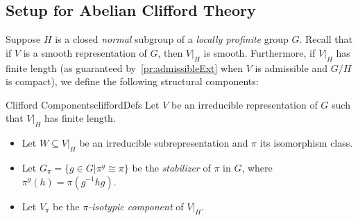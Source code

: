\documentclass{article}
\renewcommand{\mid}{\big|}
\begin{document}
\subsection*{Setup for Abelian Clifford Theory}

Suppose $H$ is a closed \emph{normal} subgroup of a \emph{locally profinite} group $G$.
Recall that if $V$ is a smooth representation of $G$, then $V|_H$ is smooth.
Furthermore, if $V|_H$ has finite length (as guaranteed by~\cref{pr:admissibleExt} when $V$ is admissible and $G/H$ is compact), we define the following structural components:

\begin{defn}{Clifford Components}{cliffordDefs}
Let $V$ be an irreducible representation of $G$ such that $V|_H$ has finite length.
\begin{itemize}
    \item Let $W \subseteq V|_H$ be an irreducible subrepresentation and $\pi$ its isomorphism class.
    \item Let $G_\pi = \{ g \in G \mid \pi^g \cong \pi \}$ be the \emph{stabilizer} of $\pi$ in $G$, where
      $\pi^g(h) = \pi(g^{-1}hg)$.
    \item Let $V_\pi$ be the \emph{$\pi$-isotypic component} of $V|_H$.
\end{itemize}
\end{defn}
\end{document}
